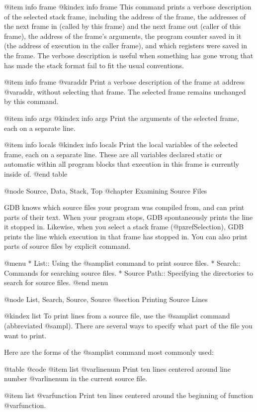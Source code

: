@item info frame
@kindex info frame
This command prints a verbose description of the selected stack frame,
including the address of the frame, the addresses of the next frame in
(called by this frame) and the next frame out (caller of this frame),
the address of the frame's arguments, the program counter saved in it
(the address of execution in the caller frame), and which registers
were saved in the frame.  The verbose description is useful when
something has gone wrong that has made the stack format fail to fit
the usual conventions.

@item info frame @var{addr}
Print a verbose description of the frame at address @var{addr},
without selecting that frame.  The selected frame remains unchanged by
this command.

@item info args
@kindex info args
Print the arguments of the selected frame, each on a separate line.

@item info locals
@kindex info locals
Print the local variables of the selected frame, each on a separate
line.  These are all variables declared static or automatic within all
program blocks that execution in this frame is currently inside of.
@end table

@node Source, Data, Stack, Top
@chapter Examining Source Files

GDB knows which source files your program was compiled from, and
can print parts of their text.  When your program stops, GDB
spontaneously prints the line it stopped in.  Likewise, when you
select a stack frame (@pxref{Selection}), GDB prints the line
which execution in that frame has stopped in.  You can also
print parts of source files by explicit command.

@menu
* List::        Using the @samp{list} command to print source files.
* Search::      Commands for searching source files.
* Source Path:: Specifying the directories to search for source files.
@end menu

@node List, Search, Source, Source
@section Printing Source Lines

@kindex list
To print lines from a source file, use the @samp{list} command
(abbreviated @samp{l}).  There are several ways to specify what part
of the file you want to print.

Here are the forms of the @samp{list} command most commonly used:

@table @code
@item list @var{linenum}
Print ten lines centered around line number @var{linenum} in the
current source file.

@item list @var{function}
Print ten lines centered around the beginning of function
@var{function}.

